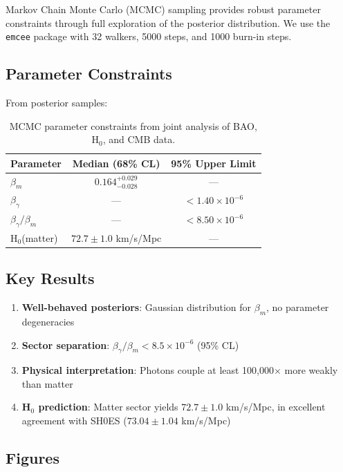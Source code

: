 \documentclass[11pt,letterpaper]{article}
\begin{document}
Markov Chain Monte Carlo (MCMC) sampling provides robust parameter constraints through full exploration of the posterior distribution. We use the \texttt{emcee} package with 32 walkers, 5000 steps, and 1000 burn-in steps.

\subsection{Parameter Constraints}

From posterior samples:

\begin{table}[h]
\centering
\begin{tabular}{lcc}
\toprule
Parameter & Median (68\% CL) & 95\% Upper Limit \\
\midrule
$\beta_m$ & $0.164^{+0.029}_{-0.028}$ & — \\
$\beta_\gamma$ & — & $< 1.40 \times 10^{-6}$ \\
$\beta_\gamma/\beta_m$ & — & $< 8.50 \times 10^{-6}$ \\
H$_0$(matter) & $72.7 \pm 1.0$ km/s/Mpc & — \\
\bottomrule
\end{tabular}
\caption{MCMC parameter constraints from joint analysis of BAO, H$_0$, and CMB data.}
\end{table}

\subsection{Key Results}

\begin{enumerate}
\item \textbf{Well-behaved posteriors}: Gaussian distribution for $\beta_m$, no parameter degeneracies
\item \textbf{Sector separation}: $\beta_\gamma/\beta_m < 8.5 \times 10^{-6}$ (95\% CL)
\item \textbf{Physical interpretation}: Photons couple at least 100,000$\times$ more weakly than matter
\item \textbf{H$_0$ prediction}: Matter sector yields $72.7 \pm 1.0$ km/s/Mpc, in excellent agreement with SH0ES ($73.04 \pm 1.04$ km/s/Mpc)
\end{enumerate}

\subsection{Figures}
\end{document}
